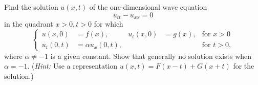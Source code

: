 \begin{problem}
  Find the solution \(u(x,t)\) of the one-dimensional wave equation
  \[
    u_{tt}-u_{xx}=0
  \]
  in the quadrant \(x>0,t>0\) for which
  \[
    \left\{
      \begin{aligned}
        u(x,0)&=f(x),&u_t(x,0)&=g(x),&\text{for \(x>0\)}\\
        u_t(0,t)&=\alpha u_x(0,t),&&&\text{for \(t>0\),}
      \end{aligned}
    \right.
  \]
  where \(\alpha\neq -1\) is a given constant. Show that generally no
  solution exists when \(\alpha=-1\). (\emph{Hint:} Use a representation
  \(u(x,t)=F(x-t)+G(x+t)\) for the solution.)
\end{problem}
\begin{solution}
\end{solution}
\newpage

